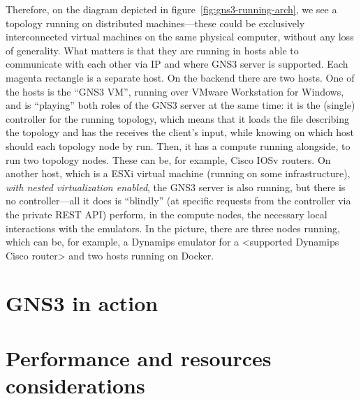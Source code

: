 Therefore, on the diagram depicted in figure~\ref{fig:gns3-running-arch}, we see a topology running on distributed machines---these could be exclusively interconnected virtual machines on the same physical computer, without any loss of generality. %
What matters is that they are running in hosts able to communicate with each other via IP and where GNS3 server is supported.
Each magenta rectangle is a separate host. %
On the backend there are two hosts.
One of the hosts is the ``GNS3 VM'', running over VMware Workstation for Windows, and is ``playing'' both roles of the GNS3 server at the same time: it is the (single) controller for the running topology, which means that it loads the file describing the topology and has the receives the client's input, while knowing on which host should each topology node by run.
Then, it has a compute running alongside, to run two topology nodes.
These can be, for example, Cisco IOSv routers. %
On another host, which is a ESXi virtual machine (running on some infrastructure), \emph{with nested virtualization enabled}, the GNS3 server is also running, but there is no controller---all it does is ``blindly'' (at specific requests from the controller via the private REST API) perform, in the compute nodes, the necessary local interactions with the emulators. %
In the picture, there are three nodes running, which can be, for example, a Dynamips emulator for a <supported Dynamips Cisco router> and two hosts running on Docker. %


\section{GNS3 in action}
\label{sec:gns3inaction}


\section{Performance and resources considerations}
\label{sec:gns3performance}


